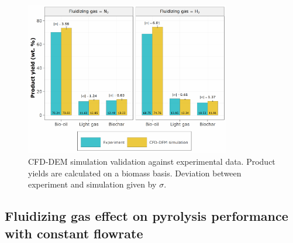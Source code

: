 \begin{figure}[H]
    \centering
    \includegraphics[width=0.8\textwidth]{figures/cfd-validation.pdf}
    \caption{CFD-DEM simulation validation against experimental data. Product yields are calculated on a biomass basis. Deviation between experiment and simulation given by $\sigma$.}
    \label{fig:cfd-validation}
\end{figure}


\subsection{Fluidizing gas effect on pyrolysis performance with constant flowrate}

